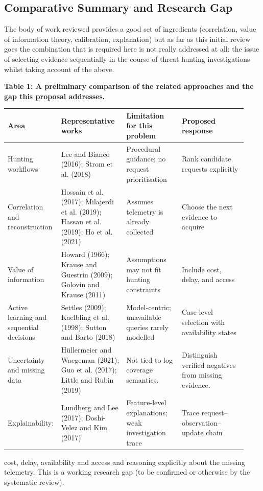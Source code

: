 \documentclass[a4paper,11pt]{article}
\begin{document}
\subsection{Comparative Summary and Research Gap}
The body of work reviewed provides a good set of ingredients (correlation, value of information theory, calibration, explanation) but as far as this initial review goes the combination that is required here is not really addressed at all: the issue of selecting evidence sequentially in the course of threat hunting investigations whilst taking account of the above.\par
\par\noindent\textbf{Table 1: A preliminary comparison of the related approaches and the gap this proposal addresses.}\par
{\footnotesize\setlength{\tabcolsep}{3pt}\renewcommand{\arraystretch}{1.16}
\begin{longtable}{@{}p{0.16\linewidth}p{0.27\linewidth}p{0.23\linewidth}p{0.27\linewidth}@{}}
\toprule
Area & Representative works & Limitation for this problem & Proposed response \\
\midrule\endhead
Hunting workflows & Lee and Bianco (2016); Strom et al. (2018) & Procedural guidance; no request prioritisation & Rank candidate requests explicitly \\
\addlinespace[3pt]
Correlation and reconstruction & Hossain et al. (2017); Milajerdi et al. (2019); Hassan et al. (2019); Ho et al. (2021) & Assumes telemetry is already collected & Choose the next evidence to acquire \\
\addlinespace[3pt]
Value of information & Howard (1966); Krause and Guestrin (2009); Golovin and Krause (2011) & Assumptions may not fit hunting constraints & Include cost, delay, and access \\
\addlinespace[3pt]
Active learning and sequential decisions & Settles (2009); Kaelbling et al. (1998); Sutton and Barto (2018) & Model-centric; unavailable queries rarely modelled & Case-level selection with availability states \\
\addlinespace[3pt]
Uncertainty and missing data & Hüllermeier and Waegeman (2021); Guo et al. (2017); Little and Rubin (2019) & Not tied to log coverage semantics. & Distinguish verified negatives from missing evidence. \\
\addlinespace[3pt]
Explainability: & Lundberg and Lee (2017); Doshi-Velez and Kim (2017) & Feature-level explanations; weak investigation trace & Trace request–observation– update chain \\
\bottomrule
\end{longtable}
}
cost, delay, availability and access and reasoning explicitly about the missing telemetry. This is a working research gap (to be confirmed or otherwise by the systematic review).\par
\end{document}
